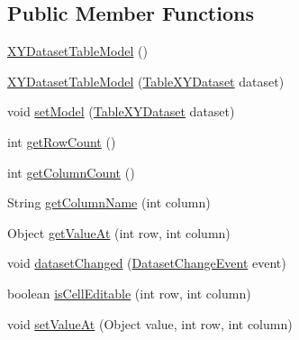 \subsection*{Public Member Functions}
\begin{DoxyCompactItemize}
\item 
\mbox{\hyperlink{classorg_1_1jfree_1_1data_1_1xy_1_1_x_y_dataset_table_model_ad4cf8e46809aa1ea976e948c69232505}{X\+Y\+Dataset\+Table\+Model}} ()
\item 
\mbox{\hyperlink{classorg_1_1jfree_1_1data_1_1xy_1_1_x_y_dataset_table_model_a87989efebad6c02284ed190e6cdc47a6}{X\+Y\+Dataset\+Table\+Model}} (\mbox{\hyperlink{interfaceorg_1_1jfree_1_1data_1_1xy_1_1_table_x_y_dataset}{Table\+X\+Y\+Dataset}} dataset)
\item 
void \mbox{\hyperlink{classorg_1_1jfree_1_1data_1_1xy_1_1_x_y_dataset_table_model_a1c2b919f81f70fabe2985a61c82e8645}{set\+Model}} (\mbox{\hyperlink{interfaceorg_1_1jfree_1_1data_1_1xy_1_1_table_x_y_dataset}{Table\+X\+Y\+Dataset}} dataset)
\item 
int \mbox{\hyperlink{classorg_1_1jfree_1_1data_1_1xy_1_1_x_y_dataset_table_model_a38cad7bbc3bf7b4d9de60089927a023f}{get\+Row\+Count}} ()
\item 
int \mbox{\hyperlink{classorg_1_1jfree_1_1data_1_1xy_1_1_x_y_dataset_table_model_a8cc3c4f508270120633efa49469abfaa}{get\+Column\+Count}} ()
\item 
String \mbox{\hyperlink{classorg_1_1jfree_1_1data_1_1xy_1_1_x_y_dataset_table_model_a7ef10accb4b33dcfc00b3284cdcf4a5a}{get\+Column\+Name}} (int column)
\item 
Object \mbox{\hyperlink{classorg_1_1jfree_1_1data_1_1xy_1_1_x_y_dataset_table_model_a55b6487bf21ce2fe201df4da3fd79329}{get\+Value\+At}} (int row, int column)
\item 
void \mbox{\hyperlink{classorg_1_1jfree_1_1data_1_1xy_1_1_x_y_dataset_table_model_a27492e15f01464d63a9a5983e1460ebb}{dataset\+Changed}} (\mbox{\hyperlink{classorg_1_1jfree_1_1data_1_1general_1_1_dataset_change_event}{Dataset\+Change\+Event}} event)
\item 
boolean \mbox{\hyperlink{classorg_1_1jfree_1_1data_1_1xy_1_1_x_y_dataset_table_model_ae13759ba0b9ded0dbea366acad4b6d10}{is\+Cell\+Editable}} (int row, int column)
\item 
void \mbox{\hyperlink{classorg_1_1jfree_1_1data_1_1xy_1_1_x_y_dataset_table_model_a5d772683f7eb46fca5d42e92429fe4e4}{set\+Value\+At}} (Object value, int row, int column)
\end{DoxyCompactItemize}


